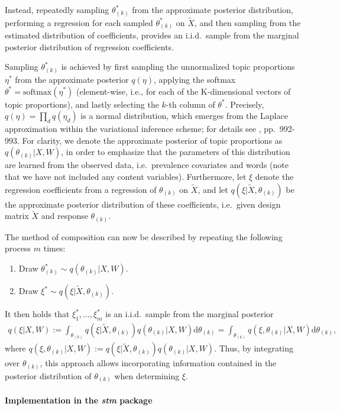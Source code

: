 Instead, repeatedly sampling $\theta_{(k)}^*$ from the approximate posterior distribution, performing a regression for each sampled $\theta_{(k)}^*$ on $\tilde{X}$, and then sampling from the estimated distribution of coefficients, provides an i.i.d.\ sample from the marginal posterior distribution of regression coefficients. 

Sampling $\theta_{(k)}^*$ is achieved by first sampling the unnormalized topic proportions $\eta^*$ from the approximate posterior $q(\eta)$, applying the softmax $\theta^* = \text{softmax}(\eta^*)$ (element-wise, i.e., for each of the K-dimensional vectors of topic proportions), and lastly selecting the $k$-th column of $\theta^*$. Precisely, $q(\eta) = \prod_d q(\eta_d)$ is a normal distribution, which emerges from the Laplace approximation within the variational inference scheme; for details see \cite{roberts2016model}, pp.\ 992-993. For clarity, we denote the approximate posterior of topic proportions as $q(\theta_{(k)} | X, W)$, in order to emphasize that the parameters of this distribution are learned from the observed data, i.e.\ prevalence covariates and words (note that we have not included any content variables). Furthermore, let $\xi$ denote the regression coefficients from a regression of $\theta_{(k)}$ on $\tilde{X}$, and let $q(\xi| \tilde{X}, \theta_{(k)})$ be the approximate posterior distribution of these coefficients, i.e.\ given design matrix $\tilde{X}$ and response $\theta_{(k)}$.

The method of composition can now be described by repeating the following process $m$ times:
\begin{enumerate}
\item Draw $\theta_{(k)}^* \sim q(\theta_{(k)} | X, W)$.
\item Draw $\xi^* \sim q(\xi | \tilde{X}, \theta_{(k)})$.
\end{enumerate}
It then holds that $\xi_1^*, \dots, \xi_m^*$ is an i.i.d.\ sample from the marginal posterior
\begin{align*}
q(\xi | X, W) := \int_{\theta_{(k)}} q(\xi| \tilde{X}, \theta_{(k)}) q(\theta_{(k)} | X, W) \text{d} \theta_{(k)} = \int_{\theta_{(k)}} q(\xi, \theta_{(k)} | X, W) \text{d} \theta_{(k)}, 
\end{align*}
where $q(\xi, \theta_{(k)} | X, W) := q(\xi| \tilde{X}, \theta_{(k)}) q(\theta_{(k)} | X, W)$. Thus, by integrating over $\theta_{(k)}$, this approach allows incorporating information contained in the posterior distribution of $\theta_{(k)}$ when determining $\xi$.\\
\\
\textbf{Implementation in the \textit{stm} package} \vspace{10px}

